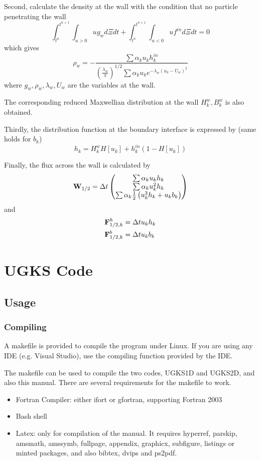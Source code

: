 \documentclass[a4paper]{book}
\begin{document}
Second, calculate the density at the wall with the condition that no particle penetrating the wall
$$\int_{t^n}^{t^{n+1}}\int_{u>0} ug_w d\Xi dt+\int_{t^n}^{t^{n+1}}\int_{u<0} uf^{in}d\Xi dt=0$$
which gives
$$\rho_w = -\frac{\sum\alpha_k u_k h_k^{in}}{\left(\frac{\lambda_w}{\pi}\right)^{1/2}\sum\alpha_k u_k e^{-\lambda_w(u_k-U_w)^2}}$$
where $g_w,\rho_w,\lambda_w,U_w$ are the variables at the wall.

The corresponding reduced Maxwellian distribution at the wall $H_k^w,B_k^w$ is also obtained.

Thirdly, the distribution function at the boundary interface is expressed by (same holds for $b_k$)
$$h_k = H_k^wH[u_k]+h_k^{in}(1-H[u_k])$$

Finally, the flux across the wall is calculated by
$$
{\bf W}_{1/2} = \Delta t
\begin{pmatrix}
    \sum\alpha_k u_k h_k\\
    \sum\alpha_k u_k^2 h_k\\
    \sum\alpha_k \frac{1}{2}\left(u_k^3 h_k+u_k b_k\right)
\end{pmatrix} 
$$
and
$$
\begin{aligned}
    {\bf F}_{1/2,k}^h &= \Delta t u_k h_k\\
    {\bf F}_{1/2,k}^b &= \Delta t u_k b_k
\end{aligned} 
$$

\chapter{UGKS Code}
\section{Usage}
\subsection{Compiling}
A makefile is provided to compile the program under Linux. If you are using any IDE (e.g. Visual Studio), use the compiling function provided by the IDE.

The makefile can be used to compile the two codes, UGKS1D and UGKS2D, and also this manual. There are several requirements for the makefile to work.
\begin{itemize}
    \item Fortran Compiler: either ifort or gfortran, supporting Fortran 2003
    \item Bash shell
    \item Latex: only for compilation of the manual. It requires hyperref, parskip, amsmath, amssymb, fullpage, appendix, graphicx, subfigure, listings or minted packages, and also bibtex, dvips and ps2pdf.
\end{itemize}
\end{document}
